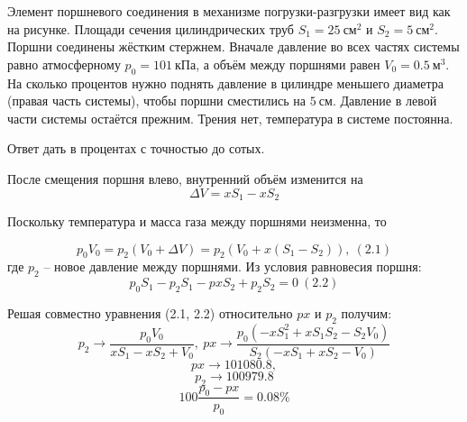 
Элемент поршневого соединения в механизме погрузки-разгрузки имеет вид как на рисунке. 
Площади сечения цилиндрических труб $  S_1 = 25 \: \text{см}^2 $ и $ S_2 = 5 \: \text{см}^2 $. 
Поршни соединены жёстким стержнем. Вначале давление во всех частях системы равно атмосферному 
$ p_0 = 101 \: \text{кПа} $, а объём между поршнями равен $ V_0=0.5 \: \text{м}^3 $. 
На сколько процентов нужно поднять давление в цилиндре меньшего диаметра 
(правая часть системы), чтобы поршни сместились на $ 5 \: \text{см} $. Давление в левой 
части системы остаётся прежним. Трения нет, температура в системе постоянна.


Ответ дать в процентах с точностью до сотых.

\solutionSection

После смещения поршня влево, внутренний объём изменится на
$$\Delta V=xS_1-xS_2$$

Поскольку температура и масса газа между поршнями неизменна, 
то 

$$p_0 V_0=p_2 (V_0+\Delta V)=p_2 (V_0+x(S_1-S_2)), \: (2.1)$$
где $p_2$ – новое давление между поршнями. Из условия равновесия поршня:
$$p_0 S_1-p_2 S_1-px S_2+p_2 S_2=0 \:(2.2)$$

Решая совместно уравнения (2.1, 2.2) относительно $px$ и $p_2$ получим:
$$p_2 \rightarrow \frac{p_0 V_0}{xS_1-xS_2+V_0}, \: px \rightarrow \frac{p_0 (-xS_1^2+xS_1 S_2-S_2 V_0)}{S_2 (-xS_1+xS_2-V_0)}$$
$$px\rightarrow 101080.8,$$
$$p_2\rightarrow 100979.8$$
$$100 \frac{p_0-px}{p_0} =0.08\%$$


